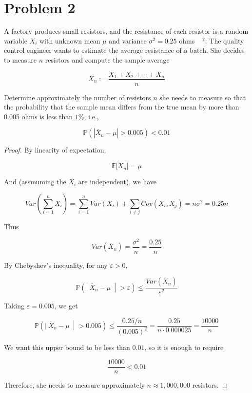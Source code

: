 \section{Problem 2}\label{hw05-problem-2}

A factory produces small resistors, and the resistance of each resistor is a random variable \(\mathit{X}_{\mathit{i}}\) with unknown mean \(\mathit{\mu}\) and variance \(\mathit{\sigma}^{2} = 0.25\) ohms \(\begin{matrix}
\end{matrix}^{2}\). The quality control engineer wants to estimate the average resistance of a batch. She decides to measure \(\mathit{n}\) resistors and compute the sample average

\[{\bar{\mathit{X}}}_{\mathit{n}} := \frac{\mathit{X}_{1} + \mathit{X}_{2} + \cdots + \mathit{X}_{\mathit{n}}}{\mathit{n}}\]

Determine approximately the number of resistors \(\mathit{n}\) she needs to measure so that the probability that the sample mean differs from the true mean by more than 0.005 ohms is less than \(1\%\), i.e.,

\[\mathbb{P}\left( {\left| {{\bar{\mathit{X}}}_{\mathit{n}} - \mathit{\mu}} \right| > 0.005} \right) < 0.01\]

\begin{proof}

By linearity of expectation,

\[\mathbb{E}\lbrack{\bar{\mathit{X}}}_{\mathit{n}}\rbrack = \mathit{\mu}\]

And (assmuming the \(\mathit{X}_{\mathit{i}}\) are independent), we have

\[Var\left( {\sum\limits_{\mathit{i} = 1}^{\mathit{n}}\mathit{X}_{\mathit{i}}} \right) = \sum\limits_{\mathit{i} = 1}^{\mathit{n}}Var(\mathit{X}_{\mathit{i}}) + \sum\limits_{\mathit{i} \neq \mathit{j}}Cov(\mathit{X}_{\mathit{i}},\mathit{X}_{\mathit{j}}) = \mathit{n}\mathit{\sigma}^{2} = 0.25\mathit{n}\]

Thus

\[Var({\bar{\mathit{X}}}_{\mathit{n}}) = \frac{\mathit{\sigma}^{2}}{\mathit{n}} = \frac{0.25}{\mathit{n}}\]

By Chebyshev's inequality, for any \(\mathit{\varepsilon} > 0\),

\[\mathbb{P}\left( |\ {\bar{\mathit{X}}}_{\mathit{n}} - \mathit{\mu}\  \middle| > \mathit{\varepsilon} \right) \leq \frac{Var({\bar{\mathit{X}}}_{\mathit{n}})}{\mathit{\varepsilon}^{2}}\]

Taking \(\mathit{\varepsilon} = 0.005\), we get

\[\mathbb{P}\left( |\ {\bar{\mathit{X}}}_{\mathit{n}} - \mathit{\mu}\  \middle| > 0.005 \right) \leq \frac{0.25/\mathit{n}}{(0.005)^{2}} = \frac{0.25}{\mathit{n} \cdot 0.000025} = \frac{10000}{\mathit{n}}\]

We want this upper bound to be less than \(0.01\), so it is enough to require

\[\frac{10000}{\mathit{n}} < 0.01\]

Therefore, she needs to measure approximately \(\mathit{n} \approx 1,000,000\) resistors.

\end{proof}

